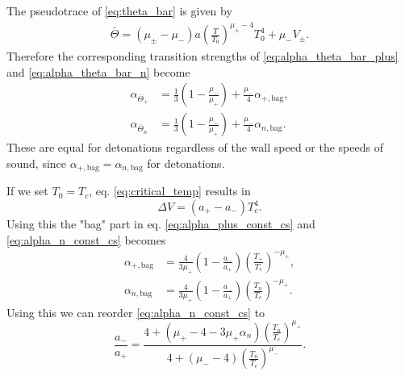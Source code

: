 The pseudotrace of \eqref{eq:theta_bar} is given by
\begin{align}
\bar{\Theta} = (\mu_\pm - \mu_-) a \left(\frac{T}{T_0}\right)^{\mu_\pm - 4} T_0^4 + \mu_- V_\pm.
\end{align}
Therefore the corresponding transition strengths of \eqref{eq:alpha_theta_bar_plus} and \eqref{eq:alpha_theta_bar_n} become
\begin{align}
\alpha_{\bar{\Theta}_+} &= \frac{1}{3} \left(1 - \frac{\mu_-}{\mu_+}\right) + \frac{\mu_-}{4} \alpha_{+,\text{bag}}, \\
\alpha_{\bar{\Theta}_n} &= \frac{1}{3} \left(1 - \frac{\mu_-}{\mu_+}\right) + \frac{\mu_-}{4} \alpha_{n,\text{bag}}.
\end{align}
These are equal for detonations regardless of the wall speed or the speeds of sound,
since $\alpha_{+,\text{bag}} = \alpha_{n,\text{bag}}$ for detonations.

If we set $T_0 = T_c$, eq. \eqref{eq:critical_temp} results in
\begin{equation}
\Delta V = (a_+ - a_-) T_c^4.
\end{equation}
Using this the "bag" part in eq. \eqref{eq:alpha_plus_const_cs} and \eqref{eq:alpha_n_const_cs} becomes
\begin{align}
\alpha_{+,\text{bag}} &= \frac{4}{3 \mu_+} \left( 1 - \frac{a_-}{a_+} \right) \left( \frac{T_+}{T_c} \right)^{-\mu_+}, \\
\alpha_{n,\text{bag}} &= \frac{4}{3 \mu_+} \left( 1 - \frac{a_-}{a_+} \right) \left( \frac{T_n}{T_c} \right)^{-\mu_+}.
\end{align}
Using this we can reorder \eqref{eq:alpha_n_const_cs} to
\begin{equation}
\frac{a_-}{a_+} = \frac{4 + \left( \mu_+ - 4 - 3 \mu_+ \alpha_n \right) \left(\frac{T_n}{T_c}\right)^{\mu_+}}{4 + \left( \mu_- - 4 \right) \left(\frac{T_n}{T_c}\right)^{\mu_-}}.
\end{equation}
\iffalse
Noting that $T_n < T_c$, this restricts $\alpha_n$ to
\begin{equation}
\alpha_n > \frac{\mu_+ - \mu_-}{3 \mu_+}.
\end{equation}
Even though we have used $T_0 = T_c$ in the intermediate steps, this restriction is general.
\fi

